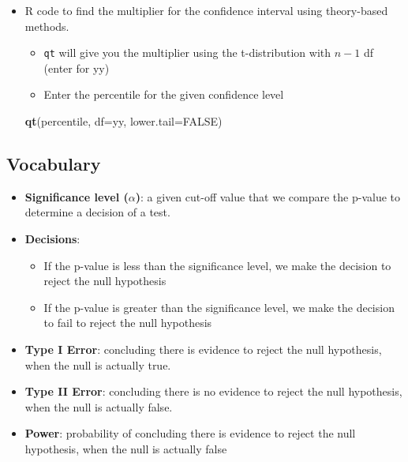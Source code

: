 \documentclass[
]{report}
\newenvironment{Shaded}{\begin{snugshade}}{\end{snugshade}}
\newcommand{\AttributeTok}[1]{\textcolor[rgb]{0.13,0.29,0.53}{#1}}
\newcommand{\ConstantTok}[1]{\textcolor[rgb]{0.56,0.35,0.01}{#1}}
\newcommand{\FunctionTok}[1]{\textcolor[rgb]{0.13,0.29,0.53}{\textbf{#1}}}
\newcommand{\NormalTok}[1]{#1}
\begin{document}
\begin{itemize}
\item
  R code to find the multiplier for the confidence interval using theory-based methods.

  \begin{itemize}
  \item
    \texttt{qt} will give you the multiplier using the t-distribution with \(n-1\) df (enter for yy)
  \item
    Enter the percentile for the given confidence level
  \end{itemize}

\begin{Shaded}
\begin{Highlighting}[]
\FunctionTok{qt}\NormalTok{(percentile, }\AttributeTok{df=}\NormalTok{yy, }\AttributeTok{lower.tail=}\ConstantTok{FALSE}\NormalTok{)}
\end{Highlighting}
\end{Shaded}
\end{itemize}

\newpage

\subsection*{Vocabulary}\label{vocabulary-5}

\begin{itemize}
\item
  \textbf{Significance level (\(\alpha\))}: a given cut-off value that we compare the p-value to determine a decision of a test.
\item
  \textbf{Decisions}:

  \begin{itemize}
  \item
    If the p-value is less than the significance level, we make the decision to reject the null hypothesis
  \item
    If the p-value is greater than the significance level, we make the decision to fail to reject the null hypothesis
  \end{itemize}
\item
  \textbf{Type I Error}: concluding there is evidence to reject the null hypothesis, when the null is actually true.
\item
  \textbf{Type II Error}: concluding there is no evidence to reject the null hypothesis, when the null is actually false.
\item
  \textbf{Power}: probability of concluding there is evidence to reject the null hypothesis, when the null is actually false
\end{itemize}
\end{document}
